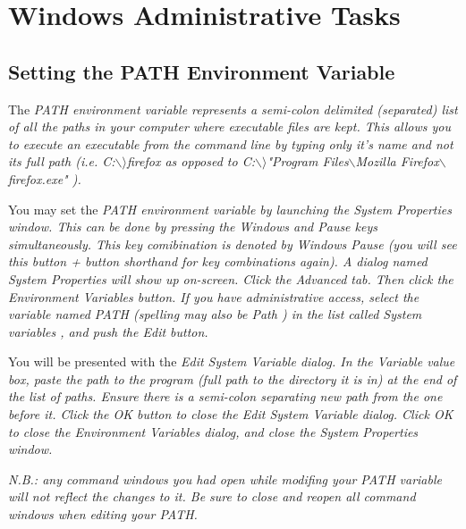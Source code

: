 
\chapter{Windows Administrative Tasks} 
\section{Setting the PATH Environment Variable}\label{path}
The \em PATH \em environment variable represents a semi-colon delimited (separated) list of all the paths in your computer where executable files are kept. This allows you to execute an executable from the command line by typing only it's name and not its full path (i.e. \em C:$\backslash$$\rangle$firefox \em as opposed to \em C:$\backslash$$\rangle$"Program Files$\backslash$Mozilla Firefox$\backslash$firefox.exe" \em).

You may set the \em PATH \em environment variable by launching the System Properties window. This can be done by pressing the \em Windows \em and \em Pause \em keys simultaneously. This key comibination is
denoted by \em Windows  Pause \em (you will see this \em button + button \em shorthand for key combinations again). A dialog named \em System Properties \em will show up on-screen. Click the \em Advanced \em tab. Then click the \em Environment Variables \em button. If you have administrative access, select the variable named \em PATH \em (spelling may also be \em Path \em) in the list called \em System variables \em, and push the \em Edit \em button.

You will be presented with the \em Edit System Variable \em dialog. In the \em Variable value \em box, paste the path to the program (full path to the directory it is in) at the end of the list of paths. Ensure there is a semi-colon separating new path from the one before it. Click the \em OK \em button to close the \em Edit System Variable \em dialog. Click \em OK \em to close the \em Environment Variables \em dialog, and close the \em System Properties \em window.

\em N.B.: any command windows you had open while modifing your PATH variable will not reflect the changes to it. Be sure to close and reopen all command windows when editing your PATH. \em
